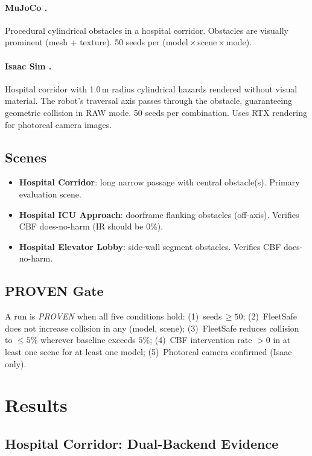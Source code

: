 \documentclass[letterpaper]{article}
\begin{document}
\paragraph{MuJoCo \cite{todorov2012mujoco}.} Procedural cylindrical obstacles in a hospital corridor.
Obstacles are visually prominent (mesh + texture). 50 seeds per
(model\,×\,scene\,×\,mode).

\paragraph{Isaac Sim \cite{nvidia2023isaac}.} Hospital corridor with 1.0\,m radius cylindrical
hazards rendered without visual material. The robot's traversal axis passes
through the obstacle, guaranteeing geometric collision in RAW mode.
50 seeds per combination. Uses RTX rendering for photoreal camera images.

\subsection{Scenes}
\begin{itemize}
  \item \textbf{Hospital Corridor}: long narrow passage with central
    obstacle(s). Primary evaluation scene.
  \item \textbf{Hospital ICU Approach}: doorframe flanking obstacles
    (off-axis). Verifies CBF does-no-harm (IR should be 0\%).
  \item \textbf{Hospital Elevator Lobby}: side-wall segment obstacles.
    Verifies CBF does-no-harm.
\end{itemize}

\subsection{PROVEN Gate}
A run is \emph{PROVEN} when all five conditions hold:
(1)~seeds\,$\geq 50$;
(2)~FleetSafe does not increase collision in any (model, scene);
(3)~FleetSafe reduces collision to $\leq 5\%$ wherever baseline exceeds $5\%$;
(4)~CBF intervention rate $>0$ in at least one scene for at least one model;
(5)~Photoreal camera confirmed (Isaac only).

\section{Results}
\label{sec:results}

\subsection{Hospital Corridor: Dual-Backend Evidence}
\end{document}
